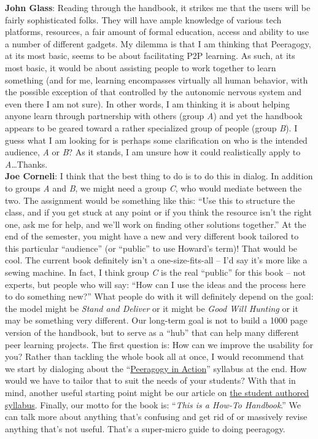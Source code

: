 \textbf{John Glass}: Reading through the handbook, it strikes me that
the users will be fairly sophisticated folks. They will have ample
knowledge of various tech platforms, resources, a fair amount of formal
education, access and ability to use a number of different gadgets. My
dilemma is that I am thinking that Peeragogy, at its most basic, seems
to be about facilitating P2P learning. As such, at its most basic, it
would be about assisting people to work together to learn something (and
for me, learning encompasses virtually all human behavior, with the
possible exception of that controlled by the autonomic nervous system
and even there I am not sure). In other words, I am thinking it is about
helping anyone learn through partnership with others (group \emph{A})
and yet the handbook appears to be geared toward a rather specialized
group of people (group \emph{B}). I guess what I am looking for is
perhaps some clarification on who is the intended audience, \emph{A} or
\emph{B}? As it stands, I am unsure how it could realistically apply to
\emph{A}\ldots{}Thanks. \\

\textbf{Joe Corneli}: I think that the best thing to do is to do this in
dialog. In addition to groups \emph{A} and \emph{B}, we might need a
group \emph{C}, who would mediate between the two. The assignment would
be something like this: ``Use this to structure the class, and if you
get stuck at any point or if you think the resource isn't the right one,
ask me for help, and we'll work on finding other solutions together.''
At the end of the semester, you might have a new and very different book
tailored to this particular ``audience'' (or ``public'' to use Howard's
term)! That would be cool. The current book definitely isn't a
one-size-fits-all -- I'd say it's more like a sewing machine. In fact, I
think group \emph{C} is the real ``public'' for this book -- not
experts, but people who will say: ``How can I use the ideas and the
process here to do something new?'' What people do with it will
definitely depend on the goal: the model might be \emph{Stand and
Deliver} or it might be \emph{Good Will Hunting} or it may be something
very different. Our long-term goal is not to build a 1000 page version
of the handbook, but to serve as a ``hub'' that can help many different
peer learning projects. The first question is: How can we improve the
usability for you? Rather than tackling the whole book all at once, I
would recommend that we start by dialoging about the
``\href{http://peeragogy.org/peeragogy-in-action/}{Peeragogy in Action}''
syllabus at the end. How would we have to tailor that to suit the needs
of your students? With that in mind, another useful starting point might
be our article on
\href{http://peeragogy.org/the-student-authored-syllabus/}{the student
authored syllabus}. Finally, our motto for the book is: ``\emph{This is
a How-To Handbook}.'' We can talk more about anything that's confusing
and get rid of or massively revise anything that's not useful. That's a
super-micro guide to doing peeragogy.

